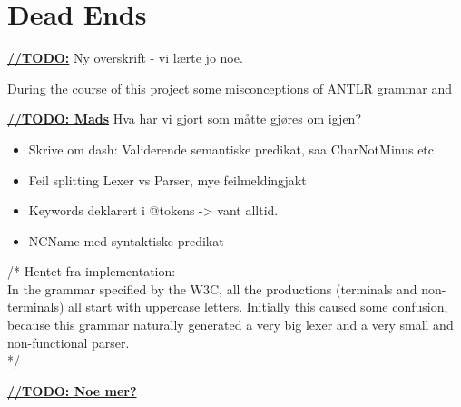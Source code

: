 \section{Dead Ends}
\label{sect:discussion:deadEnds}
\underline{\textbf{\LARGE //TODO:}} Ny overskrift - vi l\ae rte jo noe.

During the course of this project some misconceptions of ANTLR grammar and

\underline{\textbf{\LARGE //TODO: Mads}}
Hva har vi gjort som m\aa tte gj\o res om igjen?

\begin{itemize}
\item Skrive om dash: Validerende semantiske predikat, saa CharNotMinus etc
\item Feil splitting Lexer vs Parser, mye feilmeldingjakt
\item Keywords deklarert i @tokens -> vant alltid.
\item NCName med syntaktiske predikat
\end{itemize}

/* Hentet fra implementation: \\
In the grammar specified by the W3C, all the productions (terminals and
non-terminals) all start with uppercase letters. Initially this caused some
confusion, because this grammar naturally generated a very big lexer and a very
small and non-functional parser. \\
*/

\underline{\textbf{\LARGE //TODO: Noe mer?}}
